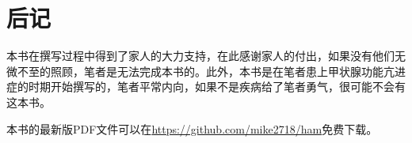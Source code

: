 \chapter*{后记}

本书在撰写过程中得到了家人的大力支持，在此感谢家人的付出，如果没有他们无微不至的照顾，笔者是无法完成本书的。此外，本书是在笔者患上甲状腺功能亢进症的时期开始撰写的，笔者平常内向，如果不是疾病给了笔者勇气，很可能不会有这本书。

本书的最新版PDF文件可以在\url{https://github.com/mike2718/ham}免费下载。
